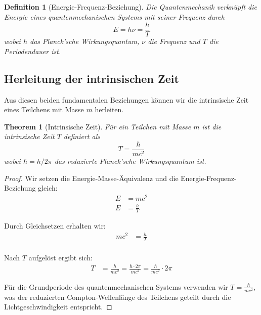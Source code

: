 \documentclass[a4paper,12pt]{article}
\newtheorem{theorem}{Theorem}[section]
\newtheorem{definition}{Definition}[section]
\begin{document}
	\begin{definition}[Energie-Frequenz-Beziehung]
		Die Quantenmechanik verknüpft die Energie eines quantenmechanischen Systems mit seiner Frequenz durch
		\begin{equation}
			E = h\nu = \frac{h}{T}
		\end{equation}
		wobei \( h \) das Planck’sche Wirkungsquantum, \( \nu \) die Frequenz und \( T \) die Periodendauer ist.
	\end{definition}
	
	\subsection{Herleitung der intrinsischen Zeit}
	
	Aus diesen beiden fundamentalen Beziehungen können wir die intrinsische Zeit eines Teilchens mit Masse \( m \) herleiten.
	
	\begin{theorem}[Intrinsische Zeit]
		Für ein Teilchen mit Masse \( m \) ist die intrinsische Zeit \( T \) definiert als
		\begin{equation}
			T = \frac{\hbar}{mc^2}
		\end{equation}
		wobei \( \hbar = h/2\pi \) das reduzierte Planck’sche Wirkungsquantum ist.
	\end{theorem}
	
	\begin{proof}
		Wir setzen die Energie-Masse-Äquivalenz und die Energie-Frequenz-Beziehung gleich:
		\begin{align}
			E &= mc^2 \\
			E &= \frac{h}{T}
		\end{align}
		
		Durch Gleichsetzen erhalten wir:
		\begin{align}
			mc^2 &= \frac{h}{T} \\
		\end{align}
		
		Nach \( T \) aufgelöst ergibt sich:
		\begin{align}
			T &= \frac{h}{mc^2} = \frac{\hbar \cdot 2\pi}{mc^2} = \frac{\hbar}{mc^2} \cdot 2\pi
		\end{align}
		
		Für die Grundperiode des quantenmechanischen Systems verwenden wir \( T = \frac{\hbar}{mc^2} \), was der reduzierten Compton-Wellenlänge des Teilchens geteilt durch die Lichtgeschwindigkeit entspricht.
	\end{proof}
	
\end{document}
